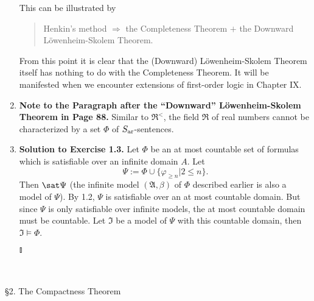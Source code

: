 \begin{enumerate}[1.]
\begin{quote}
\end{quote}
This can be illustrated by
\begin{quote}
Henkin's method $\Rightarrow$ the Completeness Theorem $+$ the Downward L\"{o}wenheim-Skolem Theorem.
\end{quote}
From this point it is clear that the (Downward) L\"{o}wenheim-Skolem Theorem itself has nothing to do with the Completeness Theorem. It will be manifested when we encounter extensions of first-order logic in Chapter IX.
%
\item \textbf{Note to the Paragraph after the ``Downward'' L\"{o}wenheim-Skolem Theorem in Page 88.} Similar to $\mathfrak{R}^<$, the field $\mathfrak{R}$ of real numbers cannot be characterized by a set $\Phi$ of $S_{\mbox{\scriptsize ar}}$-sentences.
%
\item \textbf{Solution to Exercise 1.3.} Let $\Phi$ be an at most countable set of formulas which is satisfiable over an infinite domain $A$. Let
\[
\Psi := \Phi \cup \{ \varphi_{\geq n} | 2 \leq n \}.
\]
Then $\sat \Psi$ (the infinite model $(\mathfrak{A}, \beta)$ of $\Phi$ described earlier is also a model of $\Psi$). By 1.2, $\Psi$ is satisfiable over an at most countable domain. But since $\Psi$ is only satisfiable over infinite models, the at most countable domain must be countable. Let $\mathfrak{I}$ be a model of $\Psi$ with this countable domain, then $\mathfrak{I} \models \Phi$. \begin{flushright}$\talloblong$\end{flushright}
\end{enumerate}
\ 
\\
\\
{\large \S2. The Compactness Theorem}
